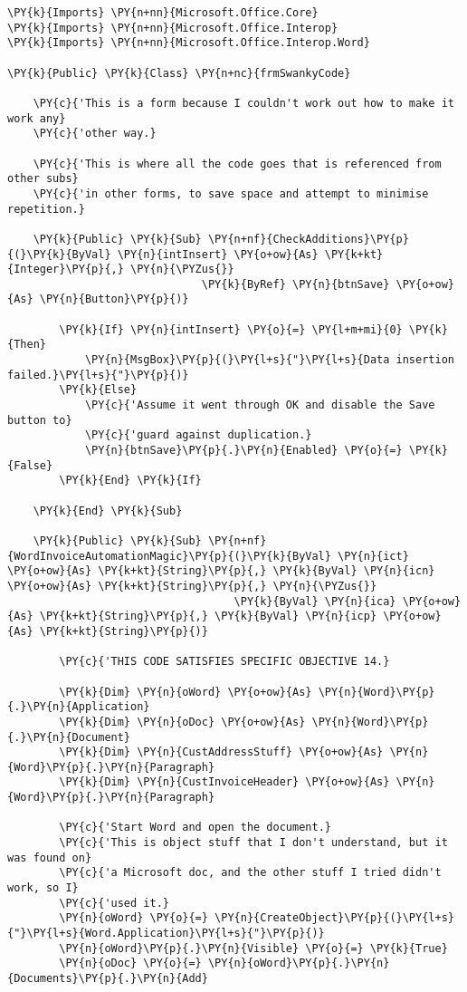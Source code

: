 \begin{Verbatim}[commandchars=\\\{\}]
\PY{k}{Imports} \PY{n+nn}{Microsoft.Office.Core}
\PY{k}{Imports} \PY{n+nn}{Microsoft.Office.Interop}
\PY{k}{Imports} \PY{n+nn}{Microsoft.Office.Interop.Word}

\PY{k}{Public} \PY{k}{Class} \PY{n+nc}{frmSwankyCode}

    \PY{c}{'This is a form because I couldn't work out how to make it work any}
    \PY{c}{'other way.}

    \PY{c}{'This is where all the code goes that is referenced from other subs}
    \PY{c}{'in other forms, to save space and attempt to minimise repetition.}

    \PY{k}{Public} \PY{k}{Sub} \PY{n+nf}{CheckAdditions}\PY{p}{(}\PY{k}{ByVal} \PY{n}{intInsert} \PY{o+ow}{As} \PY{k+kt}{Integer}\PY{p}{,} \PY{n}{\PYZus{}}
                              \PY{k}{ByRef} \PY{n}{btnSave} \PY{o+ow}{As} \PY{n}{Button}\PY{p}{)}

        \PY{k}{If} \PY{n}{intInsert} \PY{o}{=} \PY{l+m+mi}{0} \PY{k}{Then}
            \PY{n}{MsgBox}\PY{p}{(}\PY{l+s}{"}\PY{l+s}{Data insertion failed.}\PY{l+s}{"}\PY{p}{)}
        \PY{k}{Else}
            \PY{c}{'Assume it went through OK and disable the Save button to}
            \PY{c}{'guard against duplication.}
            \PY{n}{btnSave}\PY{p}{.}\PY{n}{Enabled} \PY{o}{=} \PY{k}{False}
        \PY{k}{End} \PY{k}{If}

    \PY{k}{End} \PY{k}{Sub}

    \PY{k}{Public} \PY{k}{Sub} \PY{n+nf}{WordInvoiceAutomationMagic}\PY{p}{(}\PY{k}{ByVal} \PY{n}{ict} \PY{o+ow}{As} \PY{k+kt}{String}\PY{p}{,} \PY{k}{ByVal} \PY{n}{icn} \PY{o+ow}{As} \PY{k+kt}{String}\PY{p}{,} \PY{n}{\PYZus{}}
                                   \PY{k}{ByVal} \PY{n}{ica} \PY{o+ow}{As} \PY{k+kt}{String}\PY{p}{,} \PY{k}{ByVal} \PY{n}{icp} \PY{o+ow}{As} \PY{k+kt}{String}\PY{p}{)}

        \PY{c}{'THIS CODE SATISFIES SPECIFIC OBJECTIVE 14.}

        \PY{k}{Dim} \PY{n}{oWord} \PY{o+ow}{As} \PY{n}{Word}\PY{p}{.}\PY{n}{Application}
        \PY{k}{Dim} \PY{n}{oDoc} \PY{o+ow}{As} \PY{n}{Word}\PY{p}{.}\PY{n}{Document}
        \PY{k}{Dim} \PY{n}{CustAddressStuff} \PY{o+ow}{As} \PY{n}{Word}\PY{p}{.}\PY{n}{Paragraph}
        \PY{k}{Dim} \PY{n}{CustInvoiceHeader} \PY{o+ow}{As} \PY{n}{Word}\PY{p}{.}\PY{n}{Paragraph}

        \PY{c}{'Start Word and open the document.}
        \PY{c}{'This is object stuff that I don't understand, but it was found on}
        \PY{c}{'a Microsoft doc, and the other stuff I tried didn't work, so I}
        \PY{c}{'used it.}
        \PY{n}{oWord} \PY{o}{=} \PY{n}{CreateObject}\PY{p}{(}\PY{l+s}{"}\PY{l+s}{Word.Application}\PY{l+s}{"}\PY{p}{)}
        \PY{n}{oWord}\PY{p}{.}\PY{n}{Visible} \PY{o}{=} \PY{k}{True}
        \PY{n}{oDoc} \PY{o}{=} \PY{n}{oWord}\PY{p}{.}\PY{n}{Documents}\PY{p}{.}\PY{n}{Add}


\end{Verbatim}
